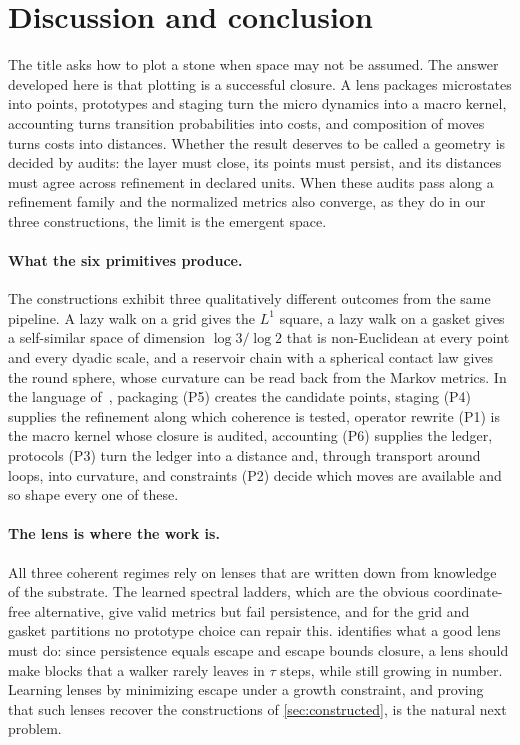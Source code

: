 \section{Discussion and conclusion}
\label{sec:conclusion}

The title asks how to plot a stone when space may not be assumed.
The answer developed here is that plotting is a successful closure.
A lens packages microstates into points, prototypes and staging turn the micro dynamics into a macro kernel, accounting turns transition probabilities into costs, and composition of moves turns costs into distances.
Whether the result deserves to be called a geometry is decided by audits: the layer must close, its points must persist, and its distances must agree across refinement in declared units.
When these audits pass along a refinement family and the normalized metrics also converge, as they do in our three constructions, the limit is the emergent space.

\paragraph{What the six primitives produce.}
The constructions exhibit three qualitatively different outcomes from the same pipeline.
A lazy walk on a grid gives the $L^1$ square, a lazy walk on a gasket gives a self-similar space of dimension $\log3/\log2$ that is non-Euclidean at every point and every dyadic scale, and a reservoir chain with a spherical contact law gives the round sphere, whose curvature can be read back from the Markov metrics.
In the language of~\cite{SixBirdsTheory}, packaging (P5) creates the candidate points, staging (P4) supplies the refinement along which coherence is tested, operator rewrite (P1) is the macro kernel whose closure is audited, accounting (P6) supplies the ledger, protocols (P3) turn the ledger into a distance and, through transport around loops, into curvature, and constraints (P2) decide which moves are available and so shape every one of these.

\paragraph{The lens is where the work is.}
All three coherent regimes rely on lenses that are written down from knowledge of the substrate.
The learned spectral ladders, which are the obvious coordinate-free alternative, give valid metrics but fail persistence, and for the grid and gasket partitions no prototype choice can repair this.
 identifies what a good lens must do: since persistence equals escape and escape bounds closure, a lens should make blocks that a walker rarely leaves in $\tau$ steps, while still growing in number.
Learning lenses by minimizing escape under a growth constraint, and proving that such lenses recover the constructions of \cref{sec:constructed}, is the natural next problem.

